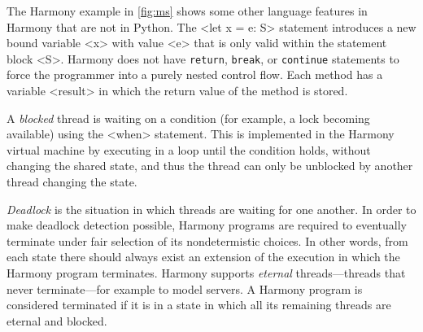 \documentclass[twocolumn]{article}
\begin{document}
The Harmony example in \autoref{fig:ms} shows some other language
features in Harmony that are not in Python.
The <{let x = e: S}> statement introduces a new bound variable <{x}>
with value <{e}> that is only valid within the statement block <{S}>.
Harmony does not have \texttt{return}, \texttt{break}, or
\texttt{continue} statements to force the programmer into a purely
nested control flow.  Each method has a variable <{result}> in which
the return value of the method is stored.

A \emph{blocked} thread is waiting on a condition
(for example, a lock becoming available) using the <{when}> statement.
This is implemented in the Harmony virtual machine
by executing in a loop until the condition holds, without changing the
shared state, and thus the thread can only be unblocked by another thread
changing the state.

\emph{Deadlock} is the situation in which threads are waiting for
one another.
In order to make deadlock detection possible, Harmony programs are
required to eventually terminate under fair selection of its
nondetermistic choices.  In other words, from each state there
should always exist an extension of the execution in which the
Harmony program terminates.  Harmony supports \emph{eternal}
threads---threads that never terminate---for example to model
servers.  A Harmony program is considered terminated if it is in a
state in which all its remaining threads are eternal and blocked.
\end{document}
